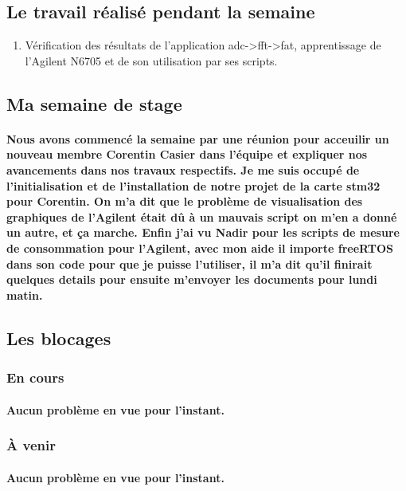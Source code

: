 \documentclass[a4paper]{article}
\begin{document}
 \subsection{Le travail réalisé pendant la semaine}
 \begin{enumerate}
\item {Vérification des résultats de l'application adc->fft->fat, apprentissage de l'Agilent N6705 et de son utilisation par ses scripts.}
\end{enumerate}

\subsection{Ma semaine de stage}
    \paragraph{Nous avons commencé la semaine par une réunion pour acceuilir un nouveau membre Corentin Casier dans l'équipe et expliquer nos avancements dans nos travaux respectifs. Je me suis occupé de l'initialisation et de l'installation de notre projet de la carte stm32 pour Corentin. On m'a dit que le problème de visualisation des graphiques de l'Agilent était dû à un mauvais script on m'en a donné un autre, et ça marche. Enfin j'ai vu Nadir pour les scripts de mesure de consommation pour l'Agilent, avec mon aide il importe freeRTOS dans son code pour que je puisse l'utiliser, il m'a dit qu'il finirait quelques details pour ensuite m'envoyer les documents pour lundi matin.}
    
    \subsection{Les blocages}
\subsubsection{En cours}
    \paragraph{Aucun problème en vue pour l'instant.}
\subsubsection{À venir}
    \paragraph{Aucun problème en vue pour l'instant.}
	\paragraph{}
\end{document}
